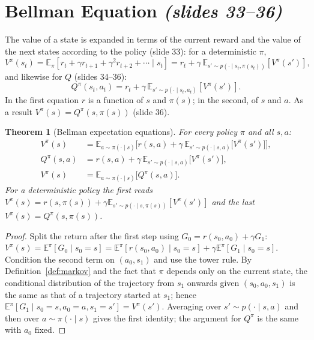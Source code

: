 \documentclass[11pt,a4paper]{article}
\newcommand{\E}{\mathbb{E}}
\newcommand{\slr}[1]{\texorpdfstring{\emph{(slides #1)}}{(slides #1)}}
\theoremstyle{plain}
\newtheorem{theorem}{Theorem}[section]
\theoremstyle{definition}
\theoremstyle{remark}
\begin{document}
\section{Bellman Equation \slr{33--36}}
The value of a state is expanded in terms of the current reward and the value of the next states according to the policy (slide 33): for a deterministic $\pi$,
\[
  V^\pi(s_t)=\E_\pi\!\left[r_t+\gamma r_{t+1}+\gamma^2r_{t+2}+\cdots\mid s_t\right]=r_t+\gamma\,\E_{s'\sim p(\cdot\mid s_t,\pi(s_t))}\!\left[V^\pi(s')\right],
\]
and likewise for $Q$ (slides 34--36):
\[
  Q^\pi(s_t,a_t)=r_t+\gamma\,\E_{s'\sim p(\cdot\mid s_t,a_t)}\!\left[V^\pi(s')\right].
\]
In the first equation $r$ is a function of $s$ and $\pi(s)$; in the second, of $s$ and $a$. As a result $V^\pi(s)=Q^\pi(s,\pi(s))$ (slide 36).

\begin{theorem}[Bellman expectation equations]\label{thm:bellexp}
For every policy $\pi$ and all $s,a$:
\begin{align*}
 V^\pi(s)&=\E_{a\sim\pi(\cdot\mid s)}\Big[r(s,a)+\gamma\,\E_{s'\sim p(\cdot\mid s,a)}\big[V^\pi(s')\big]\Big],\\
 Q^\pi(s,a)&=r(s,a)+\gamma\,\E_{s'\sim p(\cdot\mid s,a)}\big[V^\pi(s')\big],\\
 V^\pi(s)&=\E_{a\sim\pi(\cdot\mid s)}\big[Q^\pi(s,a)\big].
\end{align*}
For a deterministic policy the first reads $V^\pi(s)=r(s,\pi(s))+\gamma\E_{s'\sim p(\cdot\mid s,\pi(s))}[V^\pi(s')]$ and the last $V^\pi(s)=Q^\pi(s,\pi(s))$.
\end{theorem}
\begin{proof}
Split the return after the first step using $G_0=r(s_0,a_0)+\gamma G_1$:
$V^\pi(s)=\E^\pi[G_0\mid s_0=s]=\E^\pi[r(s_0,a_0)\mid s_0=s]+\gamma\E^\pi[G_1\mid s_0=s]$.
Condition the second term on $(a_0,s_1)$ and use the tower rule. By Definition~\ref{def:markov} and the fact that $\pi$ depends only on the current state, the conditional distribution of the trajectory from $s_1$ onwards given $(s_0,a_0,s_1)$ is the same as that of a trajectory started at $s_1$; hence $\E^\pi[G_1\mid s_0=s,a_0=a,s_1=s']=V^\pi(s')$. Averaging over $s'\sim p(\cdot\mid s,a)$ and then over $a\sim\pi(\cdot\mid s)$ gives the first identity; the argument for $Q^\pi$ is the same with $a_0$ fixed.
\end{proof}
\end{document}
